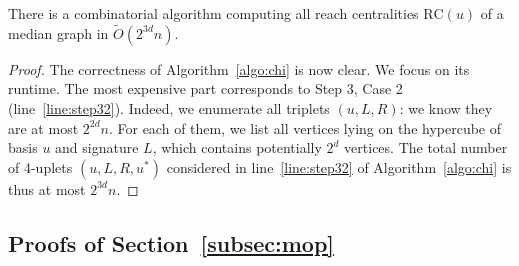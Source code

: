 \documentclass[a4paper,UKenglish,numberwithinsect,cleveref, autoref]{lipics-v2021}
\newcommand{\rc}{\mbox{RC}}
\begin{document}
\begin{theorem}
There is a combinatorial algorithm computing all  reach centralities $\rc(u)$ of a median graph in $\tilde{O}(2^{3d}n)$.
\label{th:simple_rc}
\end{theorem}
\begin{proof}
The correctness of Algorithm~\ref{algo:chi} is now clear. We focus on its runtime. The most expensive part corresponds to Step 3, Case 2 (line~\ref{line:step32}). Indeed, we enumerate all triplets $(u,L,R)$: we know they are at most $2^{2d}n$. For each of them, we list all vertices lying on the hypercube of basis $u$ and signature $L$, which contains potentially $2^d$ vertices. The total number of 4-uplets $(u,L,R,u^*)$ considered in line~\ref{line:step32} of Algorithm~\ref{algo:chi} is thus at most $2^{3d}n$.
\end{proof}

\subsection{Proofs of Section~\ref{subsec:mop}} \label{asubsec:mop}
\end{document}
